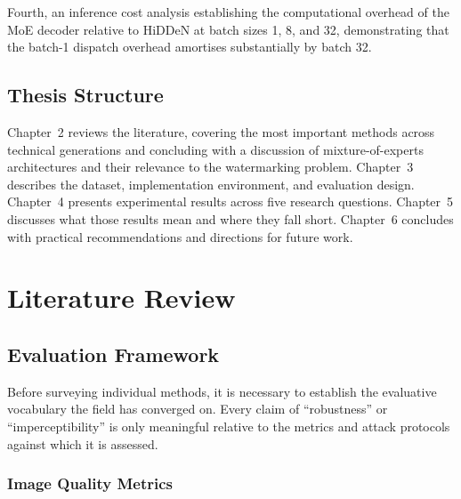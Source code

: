 ﻿\documentclass[12pt, a4paper, twoside]{report}
\numberwithin{equation}{chapter}
\begin{document}
Fourth, an inference cost analysis establishing the computational overhead of the MoE decoder relative to HiDDeN at batch sizes 1, 8, and 32, demonstrating that the batch-1 dispatch overhead amortises substantially by batch 32.
 

\section{Thesis Structure}

Chapter~2 reviews the literature, covering the most important methods across technical generations and concluding with a discussion of mixture-of-experts architectures and their relevance to the watermarking problem. Chapter~3 describes the dataset, implementation environment, and evaluation design. Chapter~4 presents experimental results across five research questions. Chapter~5 discusses what those results mean and where they fall short. Chapter~6 concludes with practical recommendations and directions for future work.

\chapter{Literature Review}

\section{Evaluation Framework}

Before surveying individual methods, it is necessary to establish the evaluative vocabulary the field has converged on. Every claim of ``robustness'' or ``imperceptibility'' is only meaningful relative to the metrics and attack protocols against which it is assessed.

\subsection*{Image Quality Metrics}
\end{document}
